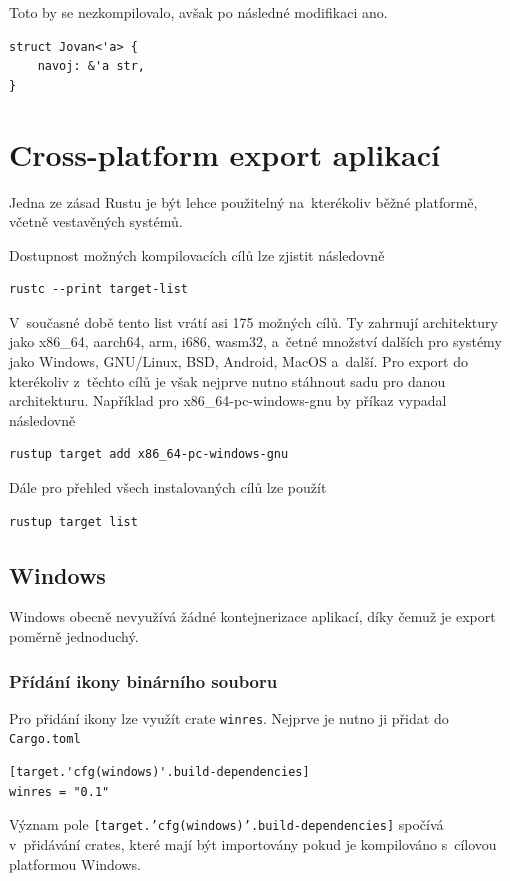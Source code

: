 \documentclass[a4paper, 12pt, twoside]{article} %
\begin{document}
				Toto by se nezkompilovalo, avšak po následné modifikaci ano.
				\begin{verbatim}
struct Jovan<'a> {
	navoj: &'a str,
}
				\end{verbatim}

\section{Cross-platform export aplikací}
	Jedna ze zásad Rustu je být lehce použitelný na~kterékoliv běžné platformě, včetně vestavěných systémů.
	
	Dostupnost možných kompilovacích cílů lze zjistit následovně
	\begin{verbatim}
rustc --print target-list
	\end{verbatim}
		
	V~současné době tento list vrátí asi 175 možných cílů. Ty zahrnují architektury jako x86\_64, aarch64, arm, i686, wasm32, a~četné množství dalších pro systémy jako Windows, GNU/Linux, BSD, Android, MacOS a~další. Pro export do kterékoliv z~těchto cílů je však nejprve nutno stáhnout sadu pro danou architekturu. Například pro x86\_64-pc-windows-gnu by příkaz vypadal následovně
	\begin{verbatim}
rustup target add x86_64-pc-windows-gnu
	\end{verbatim}
	
	Dále pro přehled všech instalovaných cílů lze použít
	\begin{verbatim}
rustup target list
	\end{verbatim}

	\subsection{Windows}
	Windows obecně nevyužívá žádné kontejnerizace aplikací, díky čemuž je export poměrně jednoduchý.
	
	\subsubsection*{Přídání ikony binárního souboru}
		Pro přidání ikony lze využít crate \texttt{winres}. Nejprve je nutno ji přidat do \texttt{Cargo.toml}
		\begin{verbatim}
[target.'cfg(windows)'.build-dependencies]
winres = "0.1"
		\end{verbatim}
		
		Význam pole \texttt{[target.'cfg(windows)'.build-dependencies]} spočívá v~přidávání crates, které mají být importovány pokud je kompilováno s~cílovou platformou Windows.
		
\end{document}
